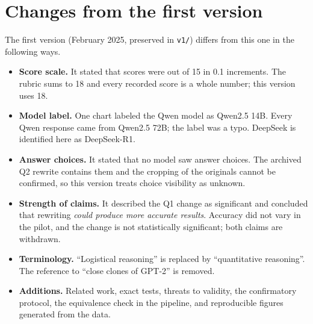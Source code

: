 \documentclass[11pt]{article}
\begin{document}
\section{Changes from the first version}
\label{app:changes}
The first version (February 2025, preserved in \texttt{v1/}) differs from this one in the following ways.
\begin{itemize}
  \item \textbf{Score scale.} It stated that scores were out of 15 in 0.1 increments. The rubric sums to 18 and every recorded score is a whole number; this version uses 18.
  \item \textbf{Model label.} One chart labeled the Qwen model as Qwen2.5 14B. Every Qwen response came from Qwen2.5 72B; the label was a typo. DeepSeek is identified here as DeepSeek-R1.
  \item \textbf{Answer choices.} It stated that no model saw answer choices. The archived Q2 rewrite contains them and the cropping of the originals cannot be confirmed, so this version treats choice visibility as unknown.
  \item \textbf{Strength of claims.} It described the Q1 change as significant and concluded that rewriting \emph{could produce more accurate results}. Accuracy did not vary in the pilot, and the change is not statistically significant; both claims are withdrawn.
  \item \textbf{Terminology.} ``Logistical reasoning'' is replaced by ``quantitative reasoning''. The reference to ``close clones of GPT-2'' is removed.
  \item \textbf{Additions.} Related work, exact tests, threats to validity, the confirmatory protocol, the equivalence check in the pipeline, and reproducible figures generated from the data.
\end{itemize}
\end{document}
